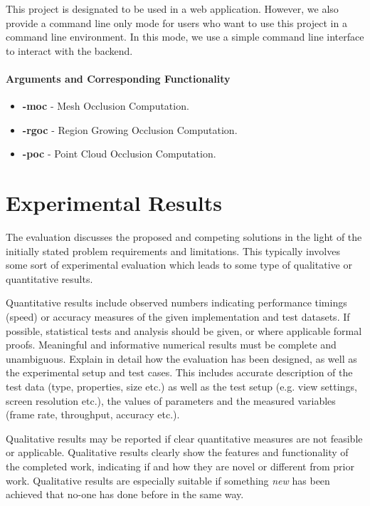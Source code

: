 \documentclass[11pt, a4paper,oneside,chapterprefix=false]{scrbook}
\begin{document}
This project is designated to be used in a web application. However, we also provide a command line only mode for users who want to use this project in a command line environment. In this mode, we use a simple command line interface to interact with the backend.

\subsubsection{Arguments and Corresponding Functionality}

\begin{itemize}
	\item \textbf{-moc} - Mesh Occlusion Computation.
	\item \textbf{-rgoc} - Region Growing Occlusion Computation.
	\item \textbf{-poc} - Point Cloud Occlusion Computation.
\end{itemize}


\chapter{Experimental Results} \label{chp:experiments}

The evaluation discusses the proposed and competing solutions in the light of the initially stated problem requirements and limitations. This typically involves some sort of experimental evaluation which leads to some type of qualitative or quantitative results.

Quantitative results include observed numbers indicating performance timings (speed) or accuracy measures of the given implementation and test datasets. If possible, statistical tests and analysis should be given, or where applicable formal proofs. Meaningful and informative numerical results must be complete and unambiguous. Explain in detail how the evaluation has been designed, as well as the experimental setup and test cases. This includes accurate description of the test data (type, properties, size etc.) as well as the test setup (e.g. view settings, screen resolution etc.), the values of parameters and the measured variables (frame rate, throughput, accuracy etc.).

Qualitative results may be reported if clear quantitative measures are not feasible or applicable. Qualitative results clearly show the features and functionality of the completed work, indicating if and how they are novel or different from prior work. Qualitative results are especially suitable if something \emph{new} has been achieved that no-one has done before in the same way.
\end{document}
